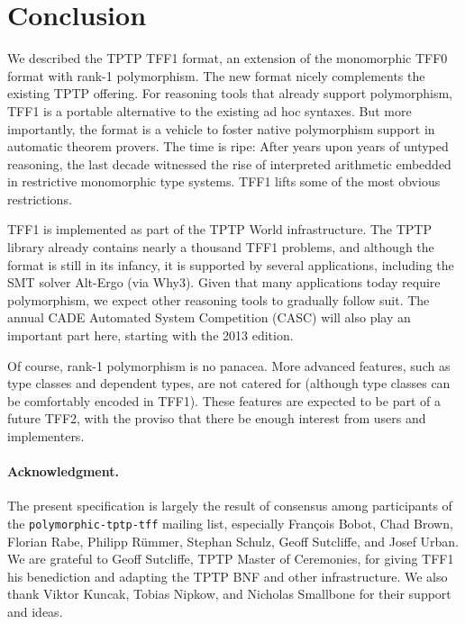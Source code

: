 \section{Conclusion}
\label{sec_concl}

We described the TPTP TFF1 format, an extension of the monomorphic TFF0 format
with rank-1 polymorphism. The new format nicely complements the existing TPTP
offering. %
For reasoning tools that already
support polymorphism, TFF1 is a portable alternative to the existing ad hoc
syntaxes. But more importantly, the format is a vehicle to foster native
polymorphism support in automatic theorem provers. The time is ripe: After years
upon years of untyped reasoning, the last decade witnessed the rise of
interpreted arithmetic embedded in restrictive monomorphic type systems. TFF1
lifts some of the most obvious restrictions.

TFF1 is implemented as part of the TPTP World infrastructure. The TPTP library
already contains nearly a thousand TFF1 problems, and although the format is
still in its infancy, it is supported by several applications, including the SMT
solver Alt-Ergo (via Why3). Given that many applications today require
polymorphism, we expect other reasoning tools to gradually follow suit. The
annual CADE Automated System Competition (CASC) will also play an important
part here, starting with the 2013 edition.

Of course, rank-1 polymorphism is no panacea. More advanced features, such as
type classes and dependent types, are not catered for (although type
classes can be comfortably encoded in TFF1). These features are expected to be
part of a future TFF2, with the proviso that there be enough interest from users
and implementers.

\def\ackname{Acknowledgment}
\paragraph{\textbf{\upshape\ackname.}}
%
The present specification is largely the result of consensus among
participants of the {\tt polymorphic-tptp-tff} mailing list, especially
Fran\c{c}ois Bobot, Chad Brown, Florian Rabe, Philipp R\"ummer, Stephan Schulz,
Geoff Sutcliffe, and Josef Urban.
We are grateful to Geoff Sutcliffe, TPTP Master of Ceremonies, for giving TFF1
his benediction and adapting the TPTP BNF and other infrastructure.
We also thank Viktor Kuncak, Tobias Nipkow, and Nicholas Smallbone for their
support and ideas.
